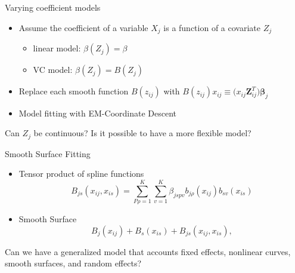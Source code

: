 \documentclass[
  ignorenonframetext,
  aspectratio=169]{beamer}
\providecommand{\tightlist}{%
  \setlength{\itemsep}{0pt}\setlength{\parskip}{0pt}}
\newcommand{\bs}[1]{\boldsymbol{#1}}
\begin{document}
\begin{frame}{Varying coefficient models}
\protect\hypertarget{varying-coefficient-models}{}
\begin{itemize}
\tightlist
\item
  Assume the coefficient of a variable \(X_j\) is a function of a
  covariate \(Z_j\)

  \begin{itemize}
  \tightlist
  \item
    linear model: \(\beta(Z_j) = \beta\)
  \item
    VC model: \(\beta(Z_j) = B(Z_j)\)
  \end{itemize}
\item
  Replace each smooth function \(B(z_{ij})\) with
  \(B(z_{ij})x_{ij}\equiv \bs (x_{ij}\bs Z_{ij}^T)\bs \beta_j\)
\item
  Model fitting with EM-Coordinate Descent
\end{itemize}

\begin{tcolorbox}[colback=green!5,colframe=green!40!black,title=Question]
  Can $Z_j$ be continuous? Is it possible to have a more flexible model? 
\end{tcolorbox}
\end{frame}

\begin{frame}{Smooth Surface Fitting}
\protect\hypertarget{smooth-surface-fitting}{}
\begin{itemize}
\tightlist
\item
  Tensor product of spline functions \[
  B_{js}(x_{ij}, x_{is}) = \sum\limits^K_{P\rho=1} \sum\limits^K_{v=1} \beta_{jspv} b_{j\rho}(x_{ij})b_{sv}(x_{is})
  \]
\item
  Smooth Surface \[
    B_j(x_{ij}) + B_s(x_{is}) + B_{js}(x_{ij}, x_{is}),
  \]
\end{itemize}

\begin{tcolorbox}[colback=green!5,colframe=green!40!black,title=Question]
  Can we have a generalized model that accounts fixed effects, nonlinear curves, smooth surfaces, and random effects?
\end{tcolorbox}
\end{frame}
\end{document}
